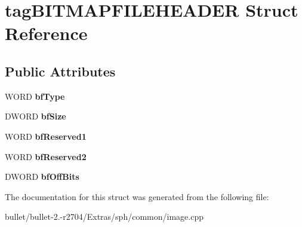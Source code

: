 \hypertarget{structtag_b_i_t_m_a_p_f_i_l_e_h_e_a_d_e_r}{\section{tag\+B\+I\+T\+M\+A\+P\+F\+I\+L\+E\+H\+E\+A\+D\+E\+R Struct Reference}
\label{structtag_b_i_t_m_a_p_f_i_l_e_h_e_a_d_e_r}
}
\subsection*{Public Attributes}
\begin{DoxyCompactItemize}
\item 
\hypertarget{structtag_b_i_t_m_a_p_f_i_l_e_h_e_a_d_e_r_a64ced0b35fb93012ce3d66b2f1dd5bb8}{W\+O\+R\+D {\bfseries bf\+Type}}\label{structtag_b_i_t_m_a_p_f_i_l_e_h_e_a_d_e_r_a64ced0b35fb93012ce3d66b2f1dd5bb8}

\item 
\hypertarget{structtag_b_i_t_m_a_p_f_i_l_e_h_e_a_d_e_r_ad6fa0d3a907934d597b2773bc45e4d43}{D\+W\+O\+R\+D {\bfseries bf\+Size}}\label{structtag_b_i_t_m_a_p_f_i_l_e_h_e_a_d_e_r_ad6fa0d3a907934d597b2773bc45e4d43}

\item 
\hypertarget{structtag_b_i_t_m_a_p_f_i_l_e_h_e_a_d_e_r_aee794445cde1ce265644c1718afc6b52}{W\+O\+R\+D {\bfseries bf\+Reserved1}}\label{structtag_b_i_t_m_a_p_f_i_l_e_h_e_a_d_e_r_aee794445cde1ce265644c1718afc6b52}

\item 
\hypertarget{structtag_b_i_t_m_a_p_f_i_l_e_h_e_a_d_e_r_a017d814d24a7c65de297be31856501dc}{W\+O\+R\+D {\bfseries bf\+Reserved2}}\label{structtag_b_i_t_m_a_p_f_i_l_e_h_e_a_d_e_r_a017d814d24a7c65de297be31856501dc}

\item 
\hypertarget{structtag_b_i_t_m_a_p_f_i_l_e_h_e_a_d_e_r_a5740a971a88afb51b014f54d9eb1c95c}{D\+W\+O\+R\+D {\bfseries bf\+Off\+Bits}}\label{structtag_b_i_t_m_a_p_f_i_l_e_h_e_a_d_e_r_a5740a971a88afb51b014f54d9eb1c95c}

\end{DoxyCompactItemize}


The documentation for this struct was generated from the following file\+:\begin{DoxyCompactItemize}
\item 
bullet/bullet-\/2.-\/r2704/\+Extras/sph/common/image.\+cpp\end{DoxyCompactItemize}
